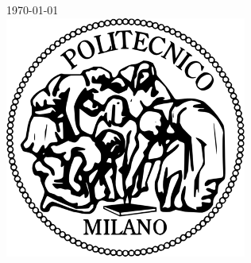 \documentclass[12pt]{article}
\begin{document}
\begin{titlepage}


{\large \today}\\[2cm] %


\includegraphics[scale=0.4]{Logo_Politecnico_Milano.png}\\[1cm] %
 

\newpage

\end{titlepage}

\tableofcontents

\newpage



\end{document}
